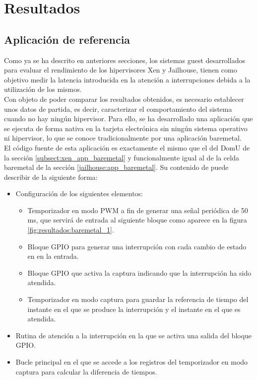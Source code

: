 \chapter{Resultados}

\section{Aplicación de referencia}

Como ya se ha descrito en anteriores secciones, los sistemas guest desarrollados para evaluar el rendimiento de los hipervisores Xen y Jailhouse, tienen como objetivo medir la latencia introducida en la atención a interrupciones debida a la utilización de los mismos. \\
Con objeto de poder comparar los resultados obtenidos, es necesario establecer unos datos de partida, es decir, caracterizar el comportamiento del sistema cuando no hay ningún hipervisor. Para ello, se ha desarrollado una aplicación que se ejecuta de forma nativa en la tarjeta electrónica sin ningún sistema operativo ni hipervisor, lo que se conoce tradicionalmente por una aplicación baremetal.\\

El código fuente de esta aplicación es exactamente el mismo que el del DomU de la sección \ref{subsect:xen_app_baremetal} y funcionalmente igual al de la celda baremetal de la sección \ref{jailhouse:app_baremetal}. Su contenido de puede describir de la siguiente forma:
\begin{itemize}
  \item Configuración de los siguientes elementos:
  \begin{itemize}
    \item Temporizador en modo \acrshort{PWM} a fin de generar una señal periódica de 50 ms, que servirá de entrada al siguiente bloque como aparece en la figura \ref{fig:resultados:baremetal_1}.
    \item Bloque \acrshort{GPIO} para generar una interrupción con cada cambio de estado en en la entrada.
    \item Bloque \acrshort{GPIO} que activa la captura indicando que la interrupción ha sido atendida.
    \item Temporizador en modo captura para guardar la referencia de tiempo del instante en el que se produce la interrupción y el instante en el que es atendida.
  \end{itemize}
  \item Rutina de atención a la interrupción en la que se activa una salida del bloque \acrshort{GPIO}.
  \item Bucle principal en el que se accede a los registros del temporizador en modo captura para calcular la diferencia de tiempos.\\
\end{itemize}

